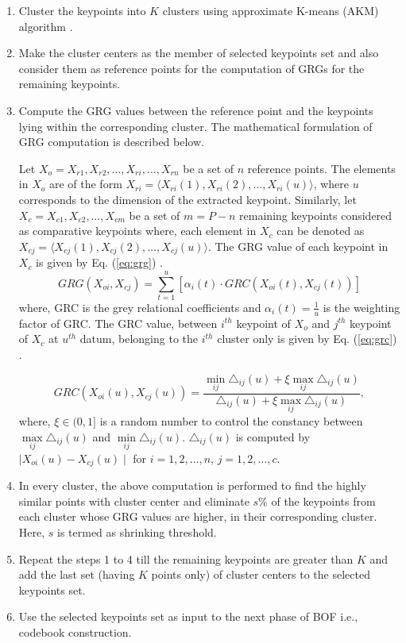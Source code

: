 \begin{enumerate}
\item Cluster the keypoints into $K$ clusters using approximate K-means  (AKM) algorithm \cite{wang2015}.
\item Make the cluster centers as the member of selected keypoints set and also consider them as reference points for the computation of GRGs for the remaining keypoints.
\item Compute the GRG values between the reference point and the keypoints lying within the corresponding cluster.  The mathematical formulation of GRG computation is described below.

Let $X_o={X_{r1}, X_{r2}, \dots, X_{ri}, \dots, X_{rn}}$ be a set of $n$ reference points. The elements in $X_o$ are of the form $X_{ri}=\langle X_{ri}(1), X_{ri}(2), \dots, X_{ri}(u) \rangle$, where $u$ corresponds to the dimension of the extracted keypoint. Similarly, let $X_c={X_{c1}, X_{c2}, \dots, X_{cm}}$ be a set of $m=P-n$ remaining keypoints considered as comparative keypoints where, each element in $X_c$ can be denoted as $X_{cj}=\langle X_{cj}(1), X_{cj}(2), \dots, X_{cj}(u) \rangle$.  The GRG value of each keypoint in $X_c$ is given by Eq. (\ref{eq:grg}) \cite{chang2005}.
\begin{equation} \label{eq:grg}
GRG (X_{oi}, X_{cj})= \sum_{t=1}^u[\alpha_i(t) \cdot GRC(X_{oi}(t), X_{cj}(t))]
\end{equation}
where, GRC is the grey relational coefficients and  $\alpha_i(t) = \frac{1}{u} $ is the weighting factor of GRC. The GRC value, between $i^{th}$ keypoint of $X_o$ and $j^{th}$ keypoint of $X_c$ at $u^{th}$ datum, belonging to the $i^{th}$ cluster only is given by Eq. (\ref{eq:grc}) \cite{chang2005}.

\begin{equation} \label{eq:grc}
GRC(X_{oi}(u), X_{cj}(u))=\frac{ \min \limits_{ij}  \triangle_{ij}(u) + \xi \max \limits_{ij} \triangle_{ij}(u) }{\triangle_{ij}(u)+\xi \max\limits_{ij} \triangle_{ij}(u)}, 
\end{equation}
where,  $\xi \in (0,1]$ is a random number to control the constancy between  $\max\limits_{ij} \triangle_{ij}(u)$ and $ \min \limits_{ij}  \triangle_{ij}(u)$.  $ \triangle_{ij}(u)$ is computed by $\mid X_{oi}(u) - X_{cj}(u) \mid$ for $i=1, 2, \dots, n$, $j=1, 2, \dots, c$.
\item In every cluster, the above computation is performed to find the highly similar points with cluster center and eliminate $s\%$ of the keypoints from each cluster whose GRG values are higher, in their corresponding cluster. Here, $s$ is termed as shrinking threshold. 
\item Repeat the steps 1 to 4 till the remaining keypoints are greater than $K$ and add  the last set (having $K$ points only) of cluster centers to the selected keypoints set.

\item Use the selected keypoints set as input to the next phase of BOF i.e., codebook construction.
\end{enumerate}

